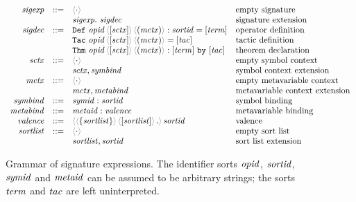 \documentclass{article}
\begin{document}
\begin{figure}[h]
  \begin{displaymath}
    \begin{array}{rcll}
       \SortSigExpr & ::=
         & \EmptySig & \text{empty signature}\\
         && \ExtendSig{\SortSigExpr}{\SortSigDecl} & \text{signature extension}\\
       \SortSigDecl & ::=
         & \DefDecl{\SortOpId}{\SortSymCtx}{\SortMetaCtx}{\SortSortId}{\SortTerm} & \text{operator definition}\\
         && \TacDecl{\SortOpId}{\SortSymCtx}{\SortMetaCtx}{\SortTac} & \text{tactic definition}\\
         && \ThmDecl{\SortOpId}{\SortSymCtx}{\SortMetaCtx}{\SortTerm}{\SortTac} & \text{theorem declaration}\\
       \SortSymCtx & ::=
         & \EmptyCtx & \text{empty symbol context}\\
         && \ExtendCtx{\SortSymCtx}{\SortSymBind} & \text{symbol context extension}\\
       \SortMetaCtx & ::=
         & \EmptyCtx & \text{empty metavariable context}\\
         && \ExtendCtx{\SortMetaCtx}{\SortMetaBind}  & \text{metavariable context extension}\\
       \SortSymBind & ::=
         & \Bind{\SortSymId}{\SortSortId} & \text{symbol binding}\\
       \SortMetaBind & ::=
         & \Bind{\SortMetaId}{\SortValence} & \text{metavariable binding}\\
       \SortValence & ::=
         & \MkValence{\SortSortList}{\SortSortList}{\SortSortId} & \text{valence}\\
       \SortSortList & ::=
         & \EmptyCtx & \text{empty sort list}\\
         && \ExtendCtx{\SortSortList}{\SortSortId} & \text{sort list extension}
     \end{array}
  \end{displaymath}

  \caption{%
    Grammar of signature expressions. The identifier sorts $\mathit{opid}$,
    $\mathit{sortid}$, $\mathit{symid}$ and $\mathit{metaid}$ can be assumed to be arbitrary
    strings; the sorts $\mathit{term}$ and $\mathit{tac}$ are left uninterpreted.%
  }
  \label{fig:grammar}
\end{figure}
\end{document}
